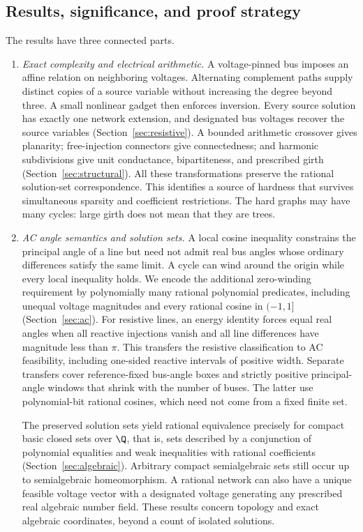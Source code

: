 \subsection{Results, significance, and proof strategy}

The results have three connected parts.

\begin{enumerate}
\item \emph{Exact complexity and electrical arithmetic.}
A voltage-pinned bus imposes an affine relation on neighboring voltages.
Alternating complement paths supply distinct copies of a source variable
without increasing the degree beyond three. A small nonlinear gadget
then enforces inversion. Every source solution has exactly one network
extension, and designated bus voltages recover the source variables
(Section~\ref{sec:resistive}). A bounded arithmetic crossover gives
planarity; free-injection connectors give connectedness; and harmonic
subdivisions give unit conductance, bipartiteness, and prescribed girth
(Section~\ref{sec:structural}). All these transformations preserve the
rational solution-set correspondence. This identifies a source of hardness
that survives simultaneous sparsity and coefficient restrictions. The hard
graphs may have many cycles: large girth does not mean that they are trees.

\item \emph{AC angle semantics and solution sets.}
A local cosine inequality constrains the principal angle of a line but
need not admit real bus angles whose ordinary differences satisfy the same
limit. A cycle can wind around the origin while every local inequality
holds. We encode the additional zero-winding requirement by polynomially
many rational polynomial predicates, including unequal voltage magnitudes
and every rational cosine in $(-1,1]$ (Section~\ref{sec:ac}). For resistive
lines, an energy identity forces equal real angles when all reactive
injections vanish and all line differences have magnitude less than $\pi$.
This transfers the resistive classification to AC feasibility, including
one-sided reactive intervals of positive width. Separate transfers cover
reference-fixed bus-angle boxes and strictly positive principal-angle
windows that shrink with the number of buses. The latter use
polynomial-bit rational cosines, which need not come from a fixed finite set.

The preserved solution sets yield rational equivalence precisely for compact
basic closed sets over $\Q$, that is, sets described by a conjunction of
polynomial equalities and weak inequalities with rational coefficients
(Section~\ref{sec:algebraic}). Arbitrary compact semialgebraic sets still
occur up to semialgebraic homeomorphism. A rational network can also have a
unique feasible voltage vector with a designated voltage generating any
prescribed real algebraic number field. These results concern topology and
exact algebraic coordinates, beyond a count of isolated solutions.


\end{enumerate}
